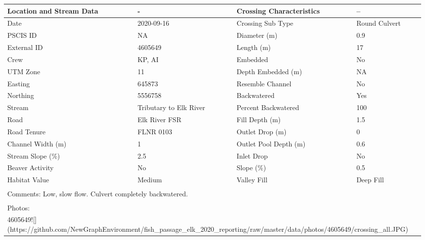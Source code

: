 \documentclass[
]{book}
\begin{document}
\begin{tabular}{l|l|l|l}
\hline
Location and Stream Data & - & Crossing Characteristics & --\\
\hline
Date & 2020-09-16 & Crossing Sub Type & Round Culvert\\
\hline
PSCIS ID & NA & Diameter (m) & 0.9\\
\hline
External ID & 4605649 & Length (m) & 17\\
\hline
Crew & KP, AI & Embedded & No\\
\hline
UTM Zone & 11 & Depth Embedded (m) & NA\\
\hline
Easting & 645873 & Resemble Channel & No\\
\hline
Northing & 5556758 & Backwatered & Yes\\
\hline
Stream & Tributary to Elk River & Percent Backwatered & 100\\
\hline
Road & Elk River FSR & Fill Depth (m) & 1.5\\
\hline
Road Tenure & FLNR 0103 & Outlet Drop (m) & 0\\
\hline
Channel Width (m) & 1 & Outlet Pool Depth (m) & 0.6\\
\hline
Stream Slope (\%) & 2.5 & Inlet Drop & No\\
\hline
Beaver Activity & No & Slope (\%) & 0.5\\
\hline
Habitat Value & Medium & Valley Fill & Deep Fill\\
\hline
\multicolumn{4}{l}{\textsuperscript{} Comments: Low, slow flow. Culvert completely backwatered.}\\
\multicolumn{4}{l}{\textsuperscript{} Photos:}\\
\multicolumn{4}{l}{4605649![](https://github.com/NewGraphEnvironment/fish\_passage\_elk\_2020\_reporting/raw/master/data/photos/4605649/crossing\_all.JPG)}\\
\end{tabular}
\end{document}
